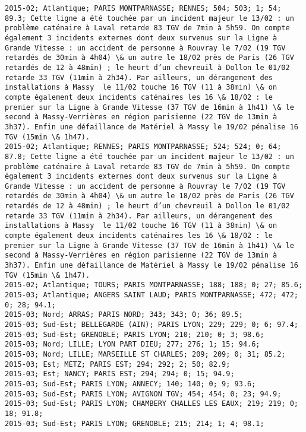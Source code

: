 \documentclass{article}
\begin{document}
\begin{Verbatim}[commandchars=\\\{\}]
2015-02; Atlantique; PARIS MONTPARNASSE; RENNES; 504; 503; 1; 54; 89.3; Cette ligne a été touchée par un incident majeur le 13/02 : un problème caténaire à Laval retarde 83 TGV de 7min à 5h59. On compte également 3 incidents externes dont deux survenus sur la Ligne à Grande Vitesse : un accident de personne à Rouvray le 7/02 (19 TGV retardés de 30min à 4h04) \& un autre le 18/02 près de Paris (26 TGV retardés de 12 à 48min) ; le heurt d’un chevreuil à Dollon le 01/02 retarde 33 TGV (11min à 2h34). Par ailleurs, un dérangement des installations à Massy  le 11/02 touche 16 TGV (11 à 38min) \& on compte également deux incidents caténaires les 16 \& 18/02 : le premier sur la Ligne à Grande Vitesse (37 TGV de 16min à 1h41) \& le second à Massy-Verrières en région parisienne (22 TGV de 13min à 3h37). Enfin une défaillance de Matériel à Massy le 19/02 pénalise 16 TGV (15min \& 1h47).
2015-02; Atlantique; RENNES; PARIS MONTPARNASSE; 524; 524; 0; 64; 87.8; Cette ligne a été touchée par un incident majeur le 13/02 : un problème caténaire à Laval retarde 83 TGV de 7min à 5h59. On compte également 3 incidents externes dont deux survenus sur la Ligne à Grande Vitesse : un accident de personne à Rouvray le 7/02 (19 TGV retardés de 30min à 4h04) \& un autre le 18/02 près de Paris (26 TGV retardés de 12 à 48min) ; le heurt d’un chevreuil à Dollon le 01/02 retarde 33 TGV (11min à 2h34). Par ailleurs, un dérangement des installations à Massy  le 11/02 touche 16 TGV (11 à 38min) \& on compte également deux incidents caténaires les 16 \& 18/02 : le premier sur la Ligne à Grande Vitesse (37 TGV de 16min à 1h41) \& le second à Massy-Verrières en région parisienne (22 TGV de 13min à 3h37). Enfin une défaillance de Matériel à Massy le 19/02 pénalise 16 TGV (15min \& 1h47).
2015-02; Atlantique; TOURS; PARIS MONTPARNASSE; 188; 188; 0; 27; 85.6; 
2015-03; Atlantique; ANGERS SAINT LAUD; PARIS MONTPARNASSE; 472; 472; 0; 28; 94.1; 
2015-03; Nord; ARRAS; PARIS NORD; 343; 343; 0; 36; 89.5; 
2015-03; Sud-Est; BELLEGARDE (AIN); PARIS LYON; 229; 229; 0; 6; 97.4; 
2015-03; Sud-Est; GRENOBLE; PARIS LYON; 210; 210; 0; 3; 98.6; 
2015-03; Nord; LILLE; LYON PART DIEU; 277; 276; 1; 15; 94.6; 
2015-03; Nord; LILLE; MARSEILLE ST CHARLES; 209; 209; 0; 31; 85.2; 
2015-03; Est; METZ; PARIS EST; 294; 292; 2; 50; 82.9; 
2015-03; Est; NANCY; PARIS EST; 294; 294; 0; 15; 94.9; 
2015-03; Sud-Est; PARIS LYON; ANNECY; 140; 140; 0; 9; 93.6; 
2015-03; Sud-Est; PARIS LYON; AVIGNON TGV; 454; 454; 0; 23; 94.9; 
2015-03; Sud-Est; PARIS LYON; CHAMBERY CHALLES LES EAUX; 219; 219; 0; 18; 91.8; 
2015-03; Sud-Est; PARIS LYON; GRENOBLE; 215; 214; 1; 4; 98.1; 

\end{Verbatim}
\end{document}
